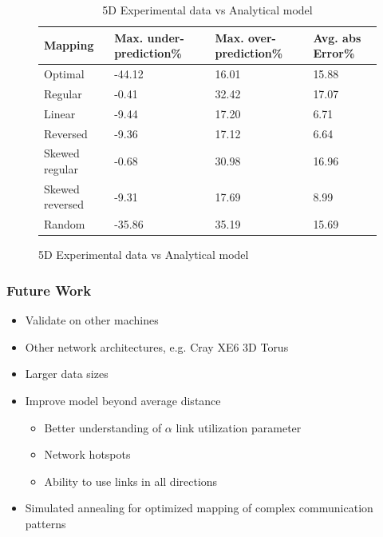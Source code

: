 \documentclass{beamer}
\begin{document}
\begin{frame}[fragile]
\begin{figure}
\caption{Analytical model effectiveness}
\begin{table}
  \caption{5D Experimental data vs Analytical model
    \label{table:data vs model 5d}}
  {\footnotesize
    \begin{tabular}{ | l | l | l | p{1.5cm} |}
    \hline
    Mapping    &    Max. under-prediction\% &    Max. over-prediction\% & Avg. abs Error\%\\ \hline
    Optimal         &         -44.12 & 16.01 & 15.88\\ \hline
    Regular         &         -0.41  & 32.42 & 17.07\\ \hline
    Linear          &         -9.44  & 17.20 & 6.71\\ \hline
    Reversed        &         -9.36  & 17.12 & 6.64\\ \hline
    Skewed regular  &         -0.68  & 30.98 & 16.96\\ \hline
    Skewed reversed &         -9.31  & 17.69 & 8.99\\ \hline
    Random          &         -35.86 & 35.19 & 15.69\\ \hline
    \hline
    \end{tabular}
  }
\end{table}

\end{figure}
\end{frame}

\begin{frame}
\frametitle{Future Work}
\begin{itemize}
  \item Validate on other machines
  \item Other network architectures, e.g. Cray XE6 3D Torus
  \item Larger data sizes
  \item Improve model beyond average distance
  \begin{itemize}
    \item Better understanding of $\alpha$ link utilization parameter
    \item Network hotspots
    \item Ability to use links in all directions
  \end{itemize}
  \item Simulated annealing for optimized mapping of complex communication patterns
\end{itemize}
\end{frame}
\end{document}
